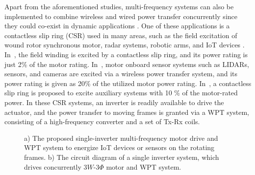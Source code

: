 \documentclass[journal]{IEEEtran}
\begin{document}
Apart from the aforementioned studies, multi-frequency systems can also be implemented to combine wireless and wired power transfer concurrently since they could co-exist in dynamic applications  \cite{wired_wireless,wired_wireless_EV}.
One of these applications is a contactless slip ring (CSR) used in many areas, such as the field excitation of wound rotor synchronous motor, radar systems, robotic arms, and IoT devices \cite{woundrotor,radar,sensor}. 
In~\cite{Rotating_CPT_field}, the field winding is excited by a contactless slip ring, and its power rating is just 2\% of the motor rating.
In~\cite{on-board}, motor onboard sensor systems such as LIDARs, sensors, and cameras are excited via a wireless power transfer system, and its power rating is given as 20\% of the utilized motor power rating. 
In~\cite{Concurrent_DC_biz}, a contactless slip ring is proposed to excite auxiliary systems with 10 \% of the motor-rated power.
In these CSR systems, an inverter is readily available to drive the actuator, and the power transfer to moving frames is granted via a WPT system, consisting of a high-frequency converter and a set of Tx-Rx coils.
\begin{figure}[t]
\centering
    \hfill
    \caption{a) The proposed single-inverter multi-frequency motor drive and WPT system to energize IoT devices or sensors on the rotating frames. b) The circuit diagram of a single inverter system, which drives concurrently  $3W$-$3\Phi$ motor and WPT system.}
    \label{fig:Circuit-diagram}
\end{figure}
\end{document}

